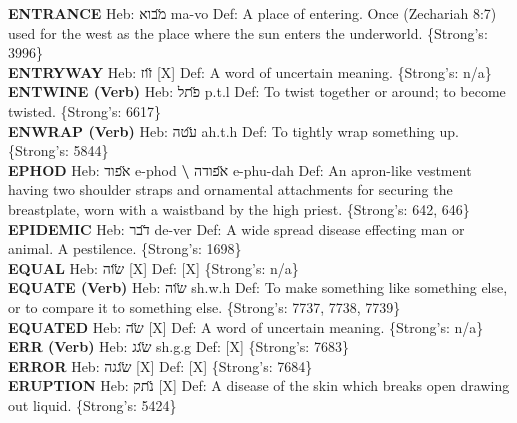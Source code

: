 {\textbf{ENTRANCE} Heb: {\large\H מבוא} ma-vo Def: A place of entering. Once (Zechariah 8:7) used for the west as the place where the sun enters the underworld. \{Strong's: 3996\}\hfill{}\\

\textbf{ENTRYWAY} Heb: {\large\H זוז} {[}X{]} Def: A word of uncertain meaning. \{Strong's: n/a\}\hfill{}\\

\textbf{ENTWINE (Verb)} Heb: {\large\H פתל} p.t.l Def: To twist together or around; to become twisted. \{Strong's: 6617\}\hfill{}\\

\textbf{ENWRAP (Verb)} Heb: {\large\H עטה} ah.t.h Def: To tightly wrap something up. \{Strong's: 5844\}\hfill{}\\

\textbf{EPHOD} Heb: {\large\H אפוד} e-phod \textbf{\textbackslash{}} {\large\H אפודה} e-phu-dah Def: An apron-like vestment having two shoulder straps and ornamental attachments for securing the breastplate, worn with a waistband by the high priest. \{Strong's: 642, 646\}\hfill{}\\

\textbf{EPIDEMIC} Heb: {\large\H דבר} de-ver Def: A wide spread disease effecting man or animal. A pestilence. \{Strong's: 1698\}\hfill{}\\

\textbf{EQUAL} Heb: {\large\H שוה} {[}X{]} Def: {[}X{]} \{Strong's: n/a\}\hfill{}\\

\textbf{EQUATE (Verb)} Heb: {\large\H שוה} sh.w.h Def: To make something like something else, or to compare it to something else. \{Strong's: 7737, 7738, 7739\}\hfill{}\\

\textbf{EQUATED} Heb: {\large\H שה} {[}X{]} Def: A word of uncertain meaning. \{Strong's: n/a\}\hfill{}\\

\textbf{ERR (Verb)} Heb: {\large\H שגג} sh.g.g Def: {[}X{]} \{Strong's: 7683\}\hfill{}\\

\textbf{ERROR} Heb: {\large\H שגגה} {[}X{]} Def: {[}X{]} \{Strong's: 7684\}\hfill{}\\

\textbf{ERUPTION} Heb: {\large\H נתק} {[}X{]} Def: A disease of the skin which breaks open drawing out liquid. \{Strong's: 5424\}\hfill{}\\

}
